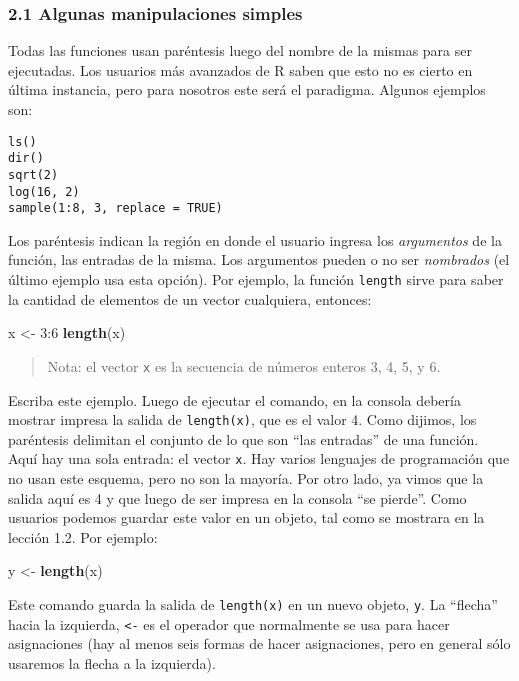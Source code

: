 \documentclass[]{article}
\newenvironment{Shaded}{}{}
\newcommand{\KeywordTok}[1]{\textcolor[rgb]{0.00,0.44,0.13}{\textbf{{#1}}}}
\newcommand{\DecValTok}[1]{\textcolor[rgb]{0.25,0.63,0.44}{{#1}}}
\newcommand{\NormalTok}[1]{{#1}}
\begin{document}
\subsubsection{2.1 Algunas manipulaciones simples}

Todas las funciones usan paréntesis luego del nombre de la mismas para
ser ejecutadas. Los usuarios más avanzados de R saben que esto no es
cierto en última instancia, pero para nosotros este será el paradigma.
Algunos ejemplos son:

\begin{verbatim}
ls()
dir()
sqrt(2)
log(16, 2)
sample(1:8, 3, replace = TRUE)
\end{verbatim}
Los paréntesis indican la región en donde el usuario ingresa los
\emph{argumentos} de la función, las entradas de la misma. Los
argumentos pueden o no ser \emph{nombrados} (el último ejemplo usa esta
opción). Por ejemplo, la función \texttt{length} sirve para saber la
cantidad de elementos de un vector cualquiera, entonces:

\begin{Shaded}
\begin{Highlighting}[]
\NormalTok{x <- }\DecValTok{3}\NormalTok{:}\DecValTok{6}
\KeywordTok{length}\NormalTok{(x)}
\end{Highlighting}
\end{Shaded}
\begin{quote}
Nota: el vector \texttt{x} es la secuencia de números enteros 3, 4, 5, y
6.

\end{quote}
Escriba este ejemplo. Luego de ejecutar el comando, en la consola
debería mostrar impresa la salida de \texttt{length(x)}, que es el valor
4. Como dijimos, los paréntesis delimitan el conjunto de lo que son
``las entradas'' de una función. Aquí hay una sola entrada: el vector
\texttt{x}. Hay varios lenguajes de programación que no usan este
esquema, pero no son la mayoría. Por otro lado, ya vimos que la salida
aquí es 4 y que luego de ser impresa en la consola ``se pierde''. Como
usuarios podemos guardar este valor en un objeto, tal como se mostrara
en la lección 1.2. Por ejemplo:

\begin{Shaded}
\begin{Highlighting}[]
\NormalTok{y <- }\KeywordTok{length}\NormalTok{(x)}
\end{Highlighting}
\end{Shaded}
Este comando guarda la salida de \texttt{length(x)} en un nuevo objeto,
\texttt{y}. La ``flecha'' hacia la izquierda, \texttt{\textless{}-} es
el operador que normalmente se usa para hacer asignaciones (hay al menos
seis formas de hacer asignaciones, pero en general sólo usaremos la
flecha a la izquierda).
\end{document}
